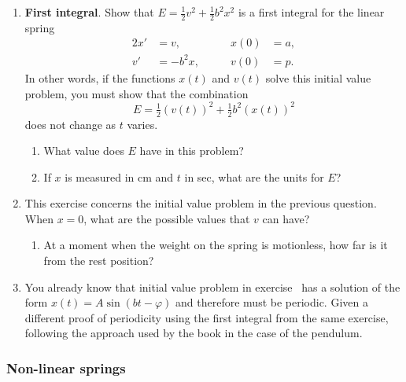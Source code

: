 \begin{enumerate}
\item {\bf First integral}. Show that $E =
\tfrac{1}{2}v^2 + \tfrac{1}{2} b^2 x^2$ is a first integral for the
linear spring
\begin{alignat*}{2}
x' &= v,      &\qquad  x(0) &= a, \\
v' &= -b^2 x, &\qquad  v(0) &= p.
\end{alignat*}
In other words, if the functions $x(t)$ and $v(t)$ solve this initial
value problem, you must show that the combination
	\[
E = \tfrac{1}{2}\left(v(t)\right)^2 + 
		\tfrac{1}{2} b^2 \left(x(t)\right)^2
\]
does not change as $t$ varies.




  \begin{enumerate}
  \item What value does $E$ have in this problem?

  \item If $x$ is measured in cm and $t$ in sec, what are the units for
$E$?


\end{enumerate}
\item This exercise concerns the initial value problem in the previous
question.  When $x = 0$, what are the possible values that $v$ can
have?

  \begin{enumerate}
  \item At a moment when the weight on the spring is motionless, how far
is it from the rest position?


\end{enumerate}
\item You already know that initial value problem in exercise
\thefirstintexercise\ has a solution of the form $x(t) = A\sin(bt -
\varphi)$ and therefore must be periodic.  Given a different proof of
periodicity using the first integral from the same exercise, following
the approach used by the book in the case of the pendulum.



\end{enumerate}
\subsubsection{Non-linear springs}
\label{subsubsec:non-linear-springs}




